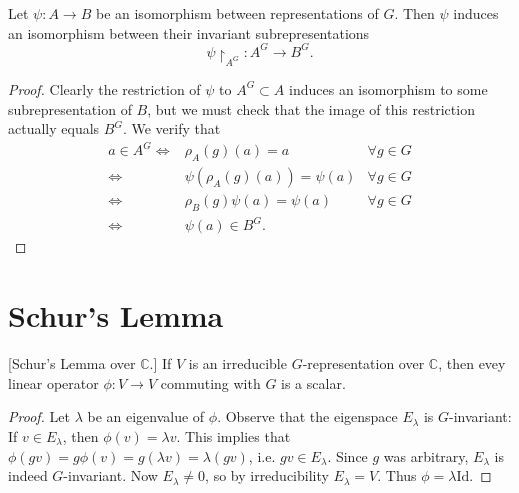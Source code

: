 \begin{lemma}\label{isomorphism-invariant-subrprns}
Let $\psi \colon A \to B$ be an isomorphism between representations of $G$. Then $\psi$ induces an isomorphism between their invariant subrepresentations 
\[ \psi \restriction_{A^G} \colon A^G \to B^G.\]
\end{lemma}
\begin{proof}
Clearly the restriction of $\psi$ to $A^G \subset A$ induces an isomorphism to some subrepresentation of $B$, but we must check that the image of this restriction actually equals $B^G$.  We verify that 
\begin{align*}
a \in A^G \iff & \rho_A (g) (a) = a & \forall g \in G \\
\iff & \psi( \rho_A (g)(a)) = \psi (a) & \forall g \in G \\
\iff & \rho_B(g) \psi(a) = \psi(a) & \forall g \in G \\
\iff & \psi(a) \in B^G.
\end{align*}
\end{proof}

\section{Schur's Lemma}
\begin{thm}\label{schur-lemma-over-c}[Schur's Lemma over $\mathbb{C}$.] If $V$ is an irreducible $G$-representation over $\mathbb{C}$, then evey linear operator $\phi \colon V \to V$ commuting with $G$ is a scalar.
\end{thm}
\begin{proof}
Let $\lambda$ be an eigenvalue of $\phi$.  Observe that the eigenspace $E_\lambda$ is $G$-invariant: If $v \in E_\lambda$, then $\phi(v) = \lambda v$.  This implies that $\phi(g v) = g \phi(v) = g (\lambda v) = \lambda (gv)$, i.e. $gv \in E_\lambda$. Since $g$ was arbitrary, $E_\lambda$ is indeed $G$-invariant.  Now $E_\lambda \neq 0$, so by irreducibility $E_\lambda = V$.  Thus $\phi = \lambda \text{Id}$.  
\end{proof}

